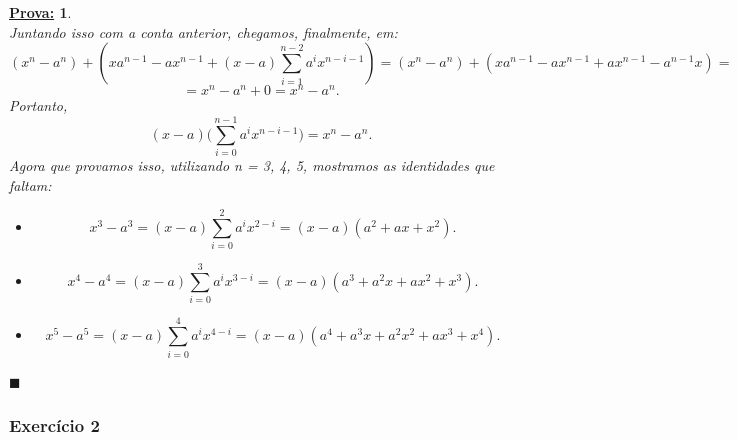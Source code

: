 \documentclass{article}
\newtheorem*{proof*}{\underline{Prova:}}
\renewcommand\qedsymbol{$\blacksquare$}
\begin{document}
\begin{proof*}
$$	$$
Juntando isso com a conta anterior, chegamos, finalmente, em:
	$$
	(x^n - a^n) + (xa^{n-1} - ax^{n-1} + (x-a)\sum_{i=1}^{n-2}a^ix^{n-i-1}) = (x^n - a^n) + (xa^{n-1} - ax^{n-1} + ax^{n-1} - a^{n-1}x ) =
	$$
	$$
	= x^n - a^n + 0 = x^n - a^n.
	$$
Portanto, 
	$$
	(x - a)\biggl(\sum_{i=0}^{n-1}a^ix^{n-i-1}\biggr) = x^n - a^n.
	$$
Agora que provamos isso, utilizando n = 3, 4, 5, mostramos as identidades que faltam:
\begin{itemize}
\item[n=3:] $$ x^3 - a^3 = (x-a)\sum_{i=0}^{2}a^ix^{2-i} = (x-a)(a^2 + ax + x^2). $$
\item[n=4:] $$ x^4 - a^4 = (x-a)\sum_{i=0}^{3}a^ix^{3-i} = (x-a)(a^3 + a^2x + ax^2 + x^3). $$
\item[n=5:] $$ x^5 - a^5 = (x-a)\sum_{i=0}^{4}a^ix^{4-i} = (x-a)(a^4 + a^3x + a^2x^2 + ax^3 + x^4).$$
\end{itemize}
\qedsymbol	
\end{proof*}

\subsubsection{Exerc\'icio 2} 
\end{document}
